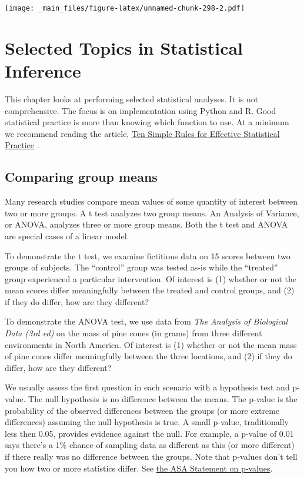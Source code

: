 \documentclass[
]{book}
\begin{document}
\texttt{[image: \_main\_files/figure-latex/unnamed-chunk-298-2.pdf]}

\hypertarget{selected-topics-in-statistical-inference}{%
\chapter{Selected Topics in Statistical Inference}\label{selected-topics-in-statistical-inference}}

This chapter looks at performing selected statistical analyses. It is not comprehensive. The focus is on implementation using Python and R. Good statistical practice is more than knowing which function to use. At a minimum we recommend reading the article, \href{https://journals.plos.org/ploscompbiol/article?id=10.1371/journal.pcbi.1004961}{Ten Simple Rules for Effective Statistical Practice} \citep{kass_caffo_davidian_meng_yu_reid_2016}.

\hypertarget{comparing-group-means}{%
\section{Comparing group means}\label{comparing-group-means}}

Many research studies compare mean values of some quantity of interest between two or more groups. A t test analyzes two group means. An Analysis of Variance, or ANOVA, analyzes three or more group means. Both the t test and ANOVA are special cases of a linear model.

To demonstrate the t test, we examine fictitious data on 15 scores between two groups of subjects. The ``control'' group was tested as-is while the ``treated'' group experienced a particular intervention. Of interest is (1) whether or not the mean scores differ meaningfully between the treated and control groups, and (2) if they do differ, how are they different?

To demonstrate the ANOVA test, we use data from \emph{The Analysis of Biological Data (3rd ed)}\citep{whitlock_schluter_2020} on the mass of pine cones (in grams) from three different environments in North America. Of interest is (1) whether or not the mean mass of pine cones differ meaningfully between the three locations, and (2) if they do differ, how are they different?

We usually assess the first question in each scenario with a hypothesis test and p-value. The null hypothesis is no difference between the means. The p-value is the probability of the observed differences between the groups (or more extreme differences) assuming the null hypothesis is true. A small p-value, traditionally less then 0.05, provides evidence against the null. For example, a p-value of 0.01 says there's a 1\% chance of sampling data as different as this (or more different) if there really was no difference between the groups. Note that p-values don't tell you how two or more statistics differ. See \href{https://www.tandfonline.com/doi/full/10.1080/00031305.2016.1154108\#_i28}{the ASA Statement on p-values}.
\end{document}
